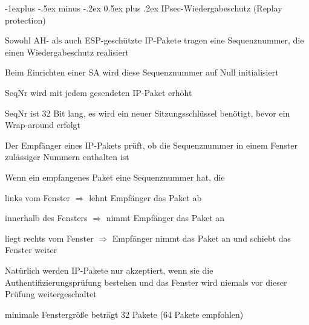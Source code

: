 \documentclass[a4paper]{article}
\makeatletter
\renewcommand{\subsection}{\@startsection{subsection}{2}{0mm}%
 {-1explus -.5ex minus -.2ex}%
 {0.5ex plus .2ex}%
 {\normalfont\normalsize\bfseries}}
\makeatother
\begin{document}
\begin{multicols}{3}
      \subsection{IPsec-Wiedergabeschutz (Replay protection)}
      \begin{itemize*}
            \item Sowohl AH- als auch ESP-geschützte IP-Pakete tragen eine Sequenznummer, die einen Wiedergabeschutz realisiert
            \begin{itemize*}
                  \item Beim Einrichten einer SA wird diese Sequenznummer auf Null initialisiert
                  \item SeqNr wird mit jedem gesendeten IP-Paket erhöht
                  \item SeqNr ist 32 Bit lang, es wird ein neuer Sitzungsschlüssel benötigt, bevor ein Wrap-around erfolgt
                  \item Der Empfänger eines IP-Pakets prüft, ob die Sequenznummer in einem Fenster zulässiger Nummern enthalten ist
            \end{itemize*}
            \item Wenn ein empfangenes Paket eine Sequenznummer hat, die
            \begin{itemize*}
                  \item links vom Fenster $\Rightarrow$ lehnt Empfänger das Paket ab
                  \item innerhalb des Fensters $\Rightarrow$ nimmt Empfänger das Paket an
                  \item liegt rechts vom Fenster $\Rightarrow$ Empfänger nimmt das Paket an und schiebt das Fenster weiter
                  \item Natürlich werden IP-Pakete nur akzeptiert, wenn sie die Authentifizierungsprüfung bestehen und das Fenster wird niemals vor dieser Prüfung weitergeschaltet
            \end{itemize*}
            \item minimale Fenstergröße beträgt 32 Pakete (64 Pakete empfohlen)
      \end{itemize*}


\end{multicols}
\end{document}
